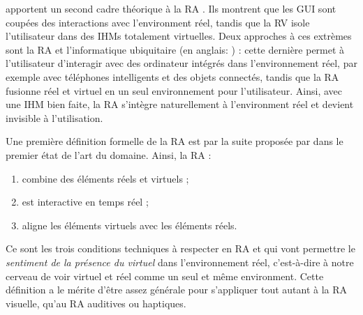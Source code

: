 
\cite{Rekimoto1995} apportent un second cadre théorique à la RA . Ils montrent que les GUI sont coupées des interactions avec l'environment réel, tandis que la RV isole l'utilisateur dans des IHMs totalement virtuelles. Deux approches à ces extrèmes sont la RA et l'informatique ubiquitaire (en anglais: ) : cette dernière permet à l'utilisateur d'interagir avec des ordinateur intégrés dans l'environnement réel, par exemple avec téléphones intelligents et des objets connectés, tandis que la RA fusionne réel et virtuel en un seul environnement pour l'utilisateur. Ainsi, avec une IHM bien faite, la RA s'intègre naturellement à l'environment réel et devient invisible à l'utilisation.


Une première définition formelle de la RA est par la suite proposée par \cite{Azuma1997} dans le premier état de l'art du domaine. Ainsi, la RA :
\begin{enumerate}
  \item combine des éléments réels et virtuels ;
  \item est interactive en temps réel ;
  \item aligne les éléments virtuels avec les éléments réels.
\end{enumerate}
Ce sont les trois conditions techniques à respecter en RA et qui vont permettre le \emph{sentiment de la présence du virtuel} dans l'environnement réel, c'est-à-dire à notre cerveau de voir virtuel et réel comme un seul et même environment. Cette définition a le mérite d'être assez générale pour s'appliquer tout autant à la RA visuelle, qu'au RA auditives ou haptiques.

